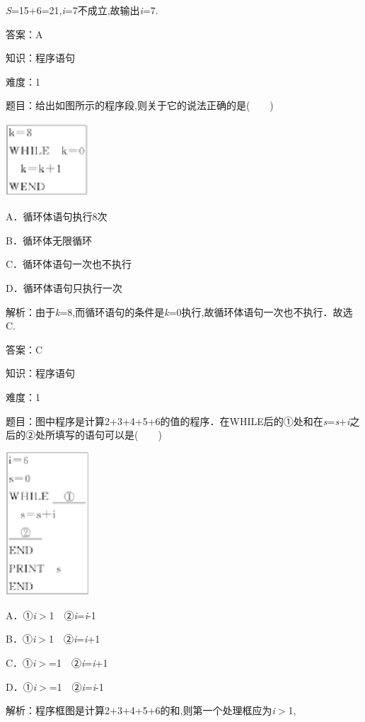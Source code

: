 \documentclass{article} %
\begin{document}
\textit{S}=15+6=21,\textit{i}=7不成立,故输出\textit{i}=7.

答案：A

知识：程序语句

难度：1

题目：给出如图所示的程序段,则关于它的说法正确的是(　　)

\includegraphics*[width=1.22in, height=1.09in, keepaspectratio=false]{image62}

A．循环体语句执行8次

B．循环体无限循环

C．循环体语句一次也不执行

D．循环体语句只执行一次

解析：由于\textit{k}=8,而循环语句的条件是\textit{k}=0执行,故循环体语句一次也不执行．故选C.

答案：C

知识：程序语句

难度：1

题目：图中程序是计算2+3+4+5+6的值的程序．在WHILE后的①处和在\textit{s}=\textit{s}+\textit{i}之后的②处所填写的语句可以是(　　)

\includegraphics*[width=1.25in, height=2.11in, keepaspectratio=false]{image63}

A．①\textit{i}$\mathrm{>}$1　②\textit{i}=\textit{i}-1

B．①\textit{i}$\mathrm{>}$1　②\textit{i}=\textit{i}+1

C．①\textit{i}$\mathrm{>}$=1　②\textit{i}=\textit{i}+1

D．①\textit{i}$\mathrm{>}$=1　②\textit{i}=\textit{i}-1

解析：程序框图是计算2+3+4+5+6的和,则第一个处理框应为\textit{i}$\mathrm{>}$1,
\end{document}
